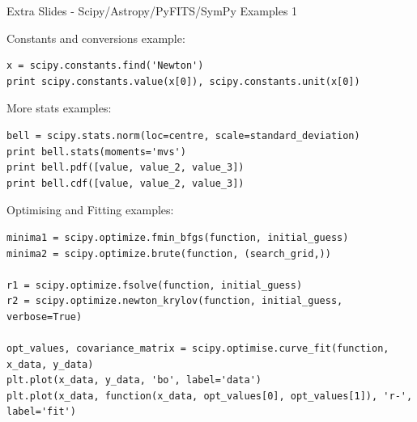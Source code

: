 \documentclass{beamer}
\begin{document}
\begin{frame}[fragile]{Extra Slides - Scipy/Astropy/PyFITS/SymPy Examples 1}
  \fontsize{6pt}{6}\selectfont
  \begin{block}{Constants and conversions example:}
  \begin{lstlisting}
x = scipy.constants.find('Newton')
print scipy.constants.value(x[0]), scipy.constants.unit(x[0])
  \end{lstlisting}
  \end{block}   
  \begin{block}{More stats examples:}
  \begin{lstlisting}
bell = scipy.stats.norm(loc=centre, scale=standard_deviation)
print bell.stats(moments='mvs')
print bell.pdf([value, value_2, value_3])
print bell.cdf([value, value_2, value_3])
  \end{lstlisting}
  \end{block}
  \begin{block}{Optimising and Fitting examples:}
  \begin{lstlisting}
minima1 = scipy.optimize.fmin_bfgs(function, initial_guess)
minima2 = scipy.optimize.brute(function, (search_grid,))

r1 = scipy.optimize.fsolve(function, initial_guess)
r2 = scipy.optimize.newton_krylov(function, initial_guess, verbose=True)

opt_values, covariance_matrix = scipy.optimise.curve_fit(function, x_data, y_data)
plt.plot(x_data, y_data, 'bo', label='data')
plt.plot(x_data, function(x_data, opt_values[0], opt_values[1]), 'r-', label='fit')
  \end{lstlisting}
  \end{block}
\end{frame}
\end{document}
